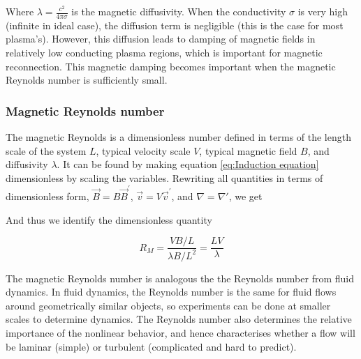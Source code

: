 Where $\lambda = \frac{c^2}{4 \pi \sigma}$ is the magnetic diffusivity. When the conductivity $\sigma$ is very high (infinite in ideal case), the diffusion term is negligible (this is the case for most plasma's). However, this diffusion leads to damping of magnetic fields in relatively low conducting plasma regions, which is important for magnetic reconnection. This magnetic damping becomes important when the magnetic Reynolds number is sufficiently small.

\subsubsection{Magnetic Reynolds number}

The magnetic Reynolds is a dimensionless number defined in terms of the length scale of the system $L$, typical velocity scale $V$, typical magnetic field $B$, and diffusivity $\lambda$. It can be found by making equation \ref{eq:Induction equation} dimensionless by scaling the variables. Rewriting all quantities in terms of dimensionless form, $\Vec{B} = B\Vec{B}^'$, $\Vec{v} = V \Vec{v}^'$, and $\nabla=\nabla'$, we get 

    



And thus we identify the dimensionless quantity

\begin{equation}\label{eq:Magnetic Reynolds number}
    R_M = \frac{V B/L}{\lambda B / L^2} = \frac{L V}{\lambda}
\end{equation}

The magnetic Reynolds number is analogous the the Reynolds number from fluid dynamics. In fluid dynamics, the Reynolds number is the same for fluid flows around geometrically similar objects, so experiments can be done at smaller scales to determine dynamics. The Reynolds number also determines the relative importance of the nonlinear behavior, and hence characterises whether a flow will be laminar (simple) or turbulent (complicated and hard to predict). 


